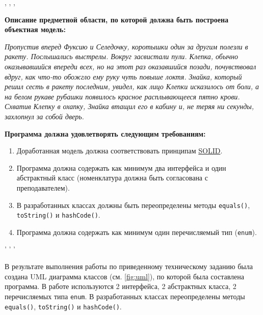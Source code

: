 \tableofcontents


\newpage
\Chapter{\lab\ \labnumber}{\labtheme}{}

\begin{center}
, , ,
\end{center}
\noindent
\textbf{
    Описание предметной области, по которой должна быть построена объектная модель:
}

\textit{
    Пропустив вперед Фуксию и Селедочку, коротышки один за другим полезли в ракету. Послышались выстрелы. Вокруг засвистали пули. Клепка, обычно оказывавшийся впереди всех, но на этот раз оказавшийся позади, почувствовал вдруг, как что-то обожгло ему руку чуть повыше локтя. Знайка, который решил сесть в ракету последним, увидел, как лицо Клепки исказилось от боли, а на белом рукаве рубашки появилось красное расплывающееся пятно крови. Схватив Клепку в охапку, Знайка втащил его в кабину и, не теряя ни секунды, захлопнул за собой дверь.\\
}

\noindent
\textbf{
    Программа должна удовлетворять следующим требованиям:
}
\begin{enumerate}
    \item Доработанная модель должна соответствовать принципам \href{https://en.wikipedia.org/wiki/SOLID}{SOLID}.
    \item Программа должна содержать как минимум два интерфейса и один абстрактный класс (номенклатура должна быть согласована с преподавателем).
    \item В разработанных классах должны быть переопределены методы \texttt{equals()}, \texttt{toString()} и \texttt{hashCode()}.
    \item Программа должна содержать как минимум один перечисляемый тип (\texttt{enum}).
\end{enumerate}
\begin{center}
    ' ' '
\end{center}

\newpage
{}
В результате выполнения работы по приведенному техническому заданию была создана UML диаграмма классов (см. \ref{fig:uml}), по которой была составлена программа. В работе используются 2 интерфейса, 2 абстрактных класса, 2 перечисляемых типа \texttt{enum}. В разработанных классах переопределены методы \texttt{equals()}, \texttt{toString()} и \texttt{hashCode()}.

